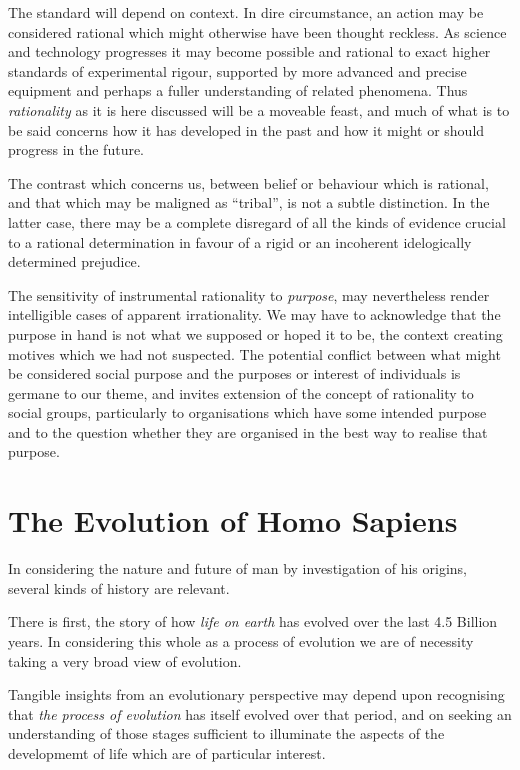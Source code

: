 \documentclass[10pt,titlepage]{article}
\begin{document}
The standard will depend on context.
In dire circumstance, an action may be considered rational which might otherwise have been thought reckless.
As science and technology progresses it may become possible and rational to exact higher standards of experimental rigour, supported by more advanced and precise equipment and perhaps a fuller understanding of related phenomena.
Thus \emph{rationality} as it is here discussed will be a moveable feast, and much of what is to be said concerns how it has developed in the past and how it might or should progress in the future.

The contrast which concerns us, between belief or behaviour which is rational, and that which may be maligned as ``tribal'', is not a subtle distinction.
In the latter case, there may be a complete disregard of all the kinds of evidence crucial to a rational determination in favour of a rigid or an incoherent idelogically determined prejudice.

The sensitivity of instrumental rationality to \emph{purpose}, may nevertheless render intelligible cases of apparent irrationality.
We may have to acknowledge that the purpose in hand is not what we supposed or hoped it to be, the context creating motives which we had not suspected.
The potential conflict between what might be considered social purpose and the purposes or interest of individuals is germane to our theme, and invites extension of the concept of rationality to social groups, particularly to organisations which have some intended purpose and to the question whether they are organised in the best way to realise that purpose.

\section{The Evolution of Homo Sapiens}

In considering the nature and future of man by investigation of his origins, several kinds of history are relevant.

There is first, the story of how \emph{life on earth} has evolved over the last 4.5 Billion years.
In considering this whole as a process of evolution we are of necessity taking a very broad view of evolution.

Tangible insights from an evolutionary perspective may depend upon recognising that \emph{the process of evolution} has itself evolved over that period, and on seeking an understanding of those stages sufficient to illuminate the aspects of the developmemt of life which are of particular interest.
\end{document}
